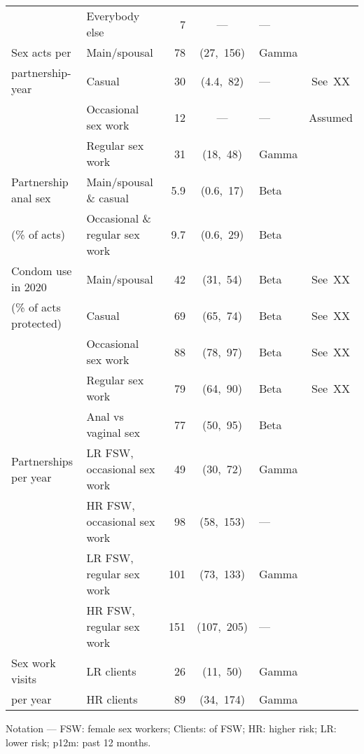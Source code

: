 \begin{tabular}{llRClc}
                          & Everybody else                 &    7 &    ---     & ---      &         \\[1ex]
  Sex acts per            & Main/spousal                   &   78 & (27,~156)  & Gamma    &         \\
  partnership-year        & Casual                         &   30 & (4.4,~82)  & ---      & See~XX  \\
                          & Occasional sex work            &   12 &    ---     & ---      & Assumed \\
                          & Regular sex work               &   31 &  (18,~48)  & Gamma    &         \\[1ex]
  Partnership anal sex    & Main/spousal \& casual         &  5.9 & (0.6,~17)  & Beta     &         \\
  (\% of acts)            & Occasional \& regular sex work &  9.7 & (0.6,~29)  & Beta     &         \\[1ex]
  Condom use in 2020      & Main/spousal                   &   42 &  (31,~54)  & Beta     & See~XX  \\
  (\% of acts protected)  & Casual                         &   69 &  (65,~74)  & Beta     & See~XX  \\
                          & Occasional sex work            &   88 &  (78,~97)  & Beta     & See~XX  \\
                          & Regular sex work               &   79 &  (64,~90)  & Beta     & See~XX  \\
                          & Anal vs vaginal sex            &   77 &  (50,~95)  & Beta     &         \\[1ex]
  Partnerships per year   & LR FSW, occasional sex work    &   49 &  (30,~72)  & Gamma    &         \\
                          & HR FSW, occasional sex work    &   98 & (58,~153)  & ---      &         \\
                          & LR FSW, regular sex work       &  101 & (73,~133)  & Gamma    &         \\
                          & HR FSW, regular sex work       &  151 & (107,~205) & ---      &         \\[1ex]
  Sex work visits         & LR clients                     &   26 &  (11,~50)  & Gamma    &         \\
  per year                & HR clients                     &   89 & (34,~174)  & Gamma    &         \\
  \bottomrule
\end{tabular}
\floatfoot
Notation ---
FSW: female sex workers;
Clients: of FSW;
HR: higher risk;
LR: lower risk;
p12m: past 12 months.